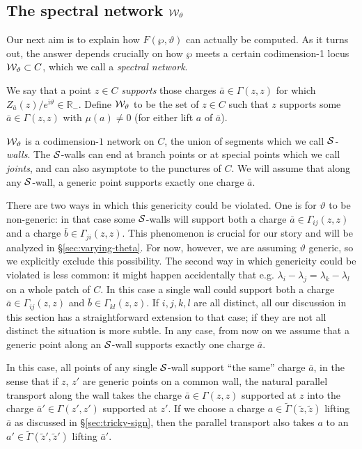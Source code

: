 \documentclass[11pt,a4paper]{article}
\def\R{{\mathbb{R}}}
\def\wnet {{\cal W}}
\def\cS {{\cal S}}
\def\tz{{\tilde z}}
\newcommand{\tGamma}{\tilde\Gamma}
\newcommand{\ti}[1]{\textit{#1}}
\def\wnet {{\cal W}}
\newcommand\I{{\mathrm i}}
\begin{document}
\subsection{The spectral network $\wnet_\vartheta$} \label{sec:spectral-network}

Our next aim is to explain how $F(\wp,\vartheta)$ can actually be computed.
As it turns out, the answer depends crucially
on how $\wp$ meets a certain codimension-1 locus
$\wnet_\vartheta \subset C$, which we call a \ti{spectral network}.

We say that a point $z \in C$
\ti{supports} those charges $\bar a \in \Gamma(z,z)$ for which $Z_{\bar a}(z) / e^{\I \vartheta} \in \R_-$.
Define $\wnet_\vartheta$ to be the set of $z \in C$ such
that $z$ supports some $\bar a \in \Gamma(z,z)$ with $\mu(a) \neq 0$ (for either lift $a$ of $\bar a$).

$\wnet_\vartheta$ is a codimension-$1$ network on $C$, the union of
segments which we call \ti{$\cS$-walls}.
The $\cS$-walls can end at branch points or at special points which we call \emph{joints},
and can also asymptote to the punctures of $C$.  We will assume that along any $\cS$-wall, a generic point
supports exactly one charge $\bar a$.

There are two ways in which this
genericity could be violated.  One is for $\vartheta$ to be non-generic:  in that case some $\cS$-walls will support
both a charge $\bar a \in \Gamma_{ij}(z,z)$ and a charge $\bar b \in \Gamma_{ji}(z,z)$.  This phenomenon is crucial for our
story and will be analyzed in \S\ref{sec:varying-theta}.  For now, however, we are assuming $\vartheta$ generic, so we explicitly exclude this
possibility.  The second way in which genericity could be violated is less common:  it might happen accidentally that
e.g. $\lambda_i - \lambda_j = \lambda_k - \lambda_l$ on a whole patch of $C$.
In this case a single wall could support both a charge
$\bar a \in \Gamma_{ij}(z,z)$ and $\bar b \in \Gamma_{kl}(z,z)$.  If $i,j,k,l$ are all distinct, all
our discussion in this section has a straightforward
extension to that case; if they are not all distinct the situation is more subtle.  In any case,
from now on we assume that a
generic point along an $\cS$-wall supports exactly one charge $\bar a$.

In this case, all points of any single $\cS$-wall support ``the same'' charge $\bar a$, in the sense that if
$z$, $z'$ are generic points on a common wall, the natural parallel transport along the wall
takes the charge $\bar a \in \Gamma(z,z)$ supported at $z$
into the charge $\bar a' \in \Gamma(z',z')$ supported at $z'$.
If we choose a charge $a \in \tGamma(\tz,\tz)$ lifting $\bar a$ as discussed in \S\ref{sec:tricky-sign},
then the parallel transport also takes $a$ to an $a' \in \tGamma(\tz',\tz')$ lifting $\bar a'$.
\end{document}
